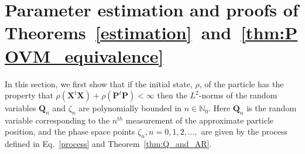 \documentclass[12pt]{article}
\begin{document}
\section{Parameter estimation and proofs of \mbox{Theorems \ref{estimation} and \ref{thm:POVM_equivalence}}}\label{sec:proof_estim}

In this section, we first show that if the initial state, $\rho$, of the particle has the property that 
\mbox{$\rho(\mathbf X^t\mathbf X)+\rho(\mathbf P^t\mathbf P)<\infty$} then the $L^2$-norms of 
the random variables $\mathbf Q_n$ and $\zeta_n$ 
are polynomially bounded in $n \in \mathbb{N}_0$. Here $\mathbf Q_n$ is the random variable corresponding to the 
$n^{th}$ measurement of the approximate particle position, and the phase space points $\zeta_n, n=0,1,2,\dots,$ are 
given by the process defined in Eq.~\eqref{process} and Theorem~\ref{thm:Q_and_AR}.
\end{document}
